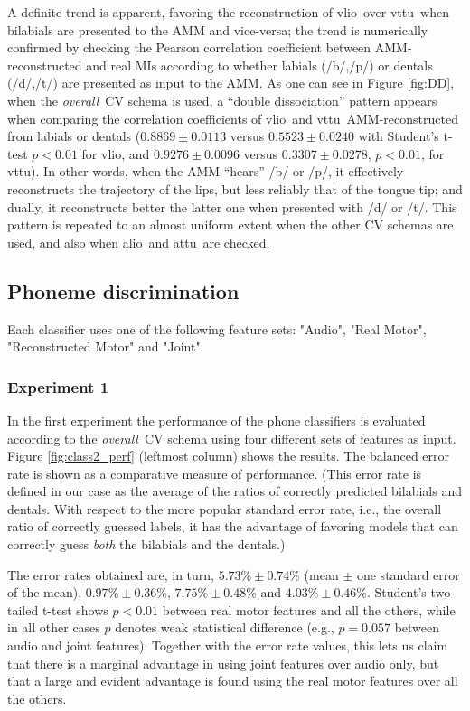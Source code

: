 \documentclass[10pt]{article}
\newcommand{\vlio}{\textsf{vlio}}
\newcommand{\vttu}{\textsf{vttu}}
\newcommand{\alio}{\textsf{alio}}
\newcommand{\attu}{\textsf{attu}}
\newcommand{\overall}{\emph{overall}}
\begin{document}
A definite trend is apparent, favoring the reconstruction of \vlio\ over \vttu\ when
bilabials are presented to the AMM and vice-versa; the trend is numerically confirmed
by checking the Pearson correlation coefficient between AMM-reconstructed and real MIs
according to whether labials (/b/,/p/) or dentals (/d/,/t/) are presented as input
to the AMM. As one can see in Figure \ref{fig:DD}, when the \overall\ CV schema is used,
a ``double dissociation'' pattern appears when comparing the correlation coefficients of
\vlio\ and \vttu\ AMM-reconstructed from labials or dentals
($0.8869 \pm 0.0113$ versus $0.5523 \pm 0.0240$ with Student's t-test $p<0.01$ for \vlio, and
 $0.9276 \pm 0.0096$ versus $0.3307 \pm 0.0278$, $p<0.01$, for \vttu).
In other words, when the AMM
``hears'' /b/ or /p/, it effectively reconstructs the trajectory of the lips, but less
reliably that of the tongue tip; and dually, it reconstructs better the latter one when
presented with /d/ or /t/. This pattern is repeated to an almost uniform extent when the
other CV schemas are used, and also when \alio\ and \attu\ are checked.

\subsection*{Phoneme discrimination}
\label{sec:class}
Each classifier uses one of the following feature sets: "Audio", "Real Motor", "Reconstructed Motor" and "Joint".
\subsubsection*{Experiment 1}
\label{subsec:exp1}

In the first experiment the performance of the phone classifiers is evaluated
according to the \overall\ CV schema using four different sets of features as
input. Figure \ref{fig:class2_perf} (leftmost column) shows the results. The balanced error rate
is shown as a comparative measure of performance. (This error rate is defined in
our case as the average of the ratios of correctly predicted bilabials and dentals.
With respect to the more popular standard error rate, i.e., the overall ratio of correctly
guessed labels, it has the advantage of favoring models that can correctly guess
\emph{both} the bilabials and the dentals.)

The error rates obtained are, in turn,
$5.73\% \pm 0.74\%$ (mean $\pm$ one standard error of the mean),
$0.97\% \pm 0.36\%$,
$7.75\% \pm 0.48\%$ and
$4.03\% \pm 0.46\%$. Student's two-tailed t-test shows $p<0.01$ between real motor features
and all the others, while in all other cases $p$ denotes weak statistical difference (e.g.,
$p=0.057$ between audio and joint features). Together with the error rate values, this lets
us claim that there is a marginal advantage in using joint features
over audio only, but that a large and evident advantage is found using the real motor features
over all the others.
\end{document}
